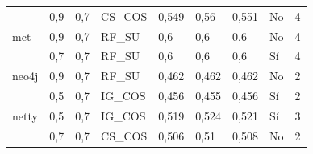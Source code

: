 \begin{table}[H]
{{\begin{tabular}{lllllllll}
                                & 0,9                               & 0,7                            & CS\_COS                                     & 0,549                                  & 0,56                                & 0,551                                 & No                                   & 4                                         \\
mct                                  & 0,9                               & 0,7                            & RF\_SU                                      & 0,6                                    & 0,6                                 & 0,6                                   & No                                   & 4                                         \\
                                  & 0,7                               & 0,7                            & RF\_SU                                      & 0,6                                    & 0,6                                 & 0,6                                   & Sí                               & 4                                         \\
neo4j                                & 0,9                               & 0,7                            & RF\_SU                                      & 0,462                                  & 0,462                               & 0,462                                 & No                                   & 2                                         \\
                                & 0,5                               & 0,7                            & IG\_COS                                     & 0,456                                  & 0,455                               & 0,456                                 & Sí                               & 2                                         \\
netty                                & 0,5                               & 0,7                            & IG\_COS                                     & 0,519                                  & 0,524                               & 0,521                                 & Sí                               & 3                                         \\
                                & 0,7                               & 0,7                            & CS\_COS                                     & 0,506                                  & 0,51                                & 0,508                                 & No                                   & 2                                         \\

\end{tabular}}}
\end{table}
